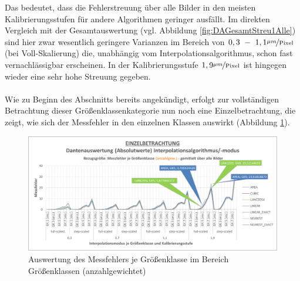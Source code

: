 \documentclass[
fontsize=10pt, 
listof = totoc,
parskip = half	
]{report}
\begin{document}
\noindent Das bedeutet, dass die Fehlerstreuung über alle Bilder in den meisten Kalibrierungsstufen für andere Algorithmen geringer ausfällt. Im direkten Vergleich mit der Gesamtauswertung (vgl. Abbildung \ref{fig:DAGesamtStreu1Alle}) sind hier zwar wesentlich geringere Varianzen im Bereich von $0,3~-~1,1\nicefrac{\mu m}{\text{Pixel}}$ (bei Voll-Skalierung) die, unabhängig vom Interpolationsalgorithmus, schon fast vernachlässigbar erscheinen. In der Kalibrierungsstufe $1,9\nicefrac{\mu m}{\text{Pixel}}$ ist hingegen wieder eine sehr hohe Streuung gegeben.
\\\\
\noindent Wie zu Beginn des Abschnitts bereits angekündigt, erfolgt zur vollständigen Betrachtung dieser Größenklassenkategorie nun noch eine Einzelbetrachtung, die zeigt, wie sich der Messfehler in den einzelnen Klassen auswirkt (Abbildung \ref{fig:DAEinzelAbsolutGKanzahl}).

\begin{figure}[H]
	\centering
	\includegraphics[width=\textwidth, height=\textheight, keepaspectratio]{pics/DA_Einzel_Absolut_GKanzahl}
	\caption{Auswertung des Messfehlers je Größenklasse im Bereich Größenklassen (anzahlgewichtet)}
	\label{fig:DAEinzelAbsolutGKanzahl}
\end{figure}
\end{document}
